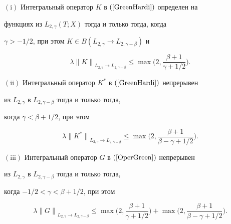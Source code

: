 \begin{thms}\label{KG}


$(\mathrm i)$ Интегральный оператор $K$ в $(\ref{GreenHardi})$ определен на


функциях из $L_{2,\gamma}(T;X)$ тогда и только тогда, когда


$\gamma > -1/2$, при этом $K \in B(L_{2,\gamma} \to


L_{2,\gamma-\beta})$ и


$$


\lambda {\|K\|}_{L_{2,\gamma} \to L_{2,\gamma-\beta}} \le


\max\bigg(2,\frac{\beta+1}{\gamma+1/2}\bigg).


$$





$(\mathrm{ii})$ Интегральный оператор $K^*$ в $(\ref{GreenHardi})$ непрерывен


из  $L_{2,\gamma}$ в $L_{2,\gamma-\beta}$ тогда и только тогда,


когда $\gamma < \beta+1/2$, при этом


$$


\lambda {\|K^*\|}_{L_{2,\gamma} \to L_{2,\gamma-\beta}} \le


\max\bigg(2,\frac{\beta+1}{\beta-\gamma+1/2}\bigg).


$$





$(\mathrm{iii})$ Интегральный оператор $G$ в $(\ref{OperGreen})$ непрерывен


из $L_{2,\gamma}$ в $L_{2,\gamma-\beta}$ тогда и только тогда, 


когда $-1/2 < \gamma< \beta+1/2$, при этом


$$


\lambda {\|G\|}_{L_{2,\gamma} \to L_{2,\gamma-\beta}} \le


\max\bigg(2,\frac{\beta+1}{\gamma+1/2}\bigg) +


\max\bigg(2,\frac{\beta+1}{\beta-\gamma+1/2}\bigg).


$$


\end{thms}








